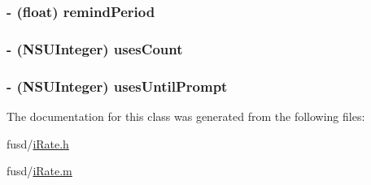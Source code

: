 \hypertarget{interfacei_rate_a1238723c7c839f38b31e1fa47165fef1}{
\subsubsection[{remind\-Period}]{\setlength{\rightskip}{0pt plus 5cm}-\/ (float) remind\-Period}}
\label{interfacei_rate_a1238723c7c839f38b31e1fa47165fef1}
\hypertarget{interfacei_rate_a3d65a098daf6bfaa73c531d2b416140f}{
\subsubsection[{uses\-Count}]{\setlength{\rightskip}{0pt plus 5cm}-\/ (\-N\-S\-U\-Integer) uses\-Count}}
\label{interfacei_rate_a3d65a098daf6bfaa73c531d2b416140f}
\hypertarget{interfacei_rate_a8641dc4daba56be1959381184824c301}{
\subsubsection[{uses\-Until\-Prompt}]{\setlength{\rightskip}{0pt plus 5cm}-\/ (\-N\-S\-U\-Integer) uses\-Until\-Prompt}}
\label{interfacei_rate_a8641dc4daba56be1959381184824c301}


\-The documentation for this class was generated from the following files\-:\begin{DoxyCompactItemize}
\item 
fusd/\hyperlink{i_rate_8h}{i\-Rate.\-h}\item 
fusd/\hyperlink{i_rate_8m}{i\-Rate.\-m}\end{DoxyCompactItemize}
